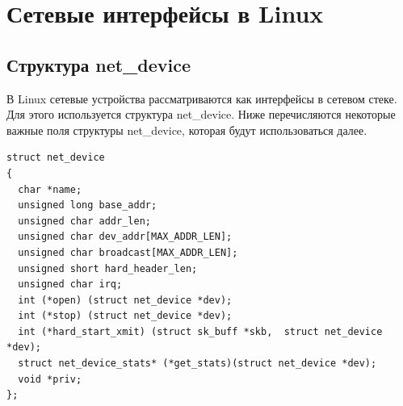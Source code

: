\newpage
\section{Сетевые интерфейсы в Linux}
\subsection{Структура net\_device}

В Linux сетевые устройства рассматриваются как интерфейсы в сетевом стеке. Для этого используется структура net\_device. Ниже перечисляются некоторые важные поля структуры net\_device, которая будут использоваться далее\cite{Love}.

\begin{Verbatim}[frame=single]
struct net_device 
{
  char *name;
  unsigned long base_addr;
  unsigned char addr_len;
  unsigned char dev_addr[MAX_ADDR_LEN];
  unsigned char broadcast[MAX_ADDR_LEN];
  unsigned short hard_header_len;
  unsigned char irq;
  int (*open) (struct net_device *dev);
  int (*stop) (struct net_device *dev);
  int (*hard_start_xmit) (struct sk_buff *skb,  struct net_device *dev);
  struct net_device_stats* (*get_stats)(struct net_device *dev);
  void *priv;
};
\end{Verbatim}

